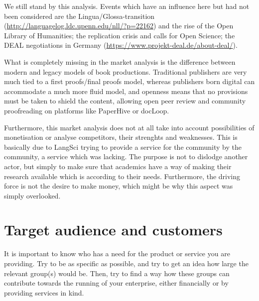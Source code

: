 \documentclass[nonflat,smallfont
]{langsci/langscibook}
\newcommand{\background}[1]{ 
  \vspace{5mm}
  \renewcommand{\tblslinecolour}{lsDarkBlue}
  \tblssy[red]{explore2}{Background}{\vspace*{-5mm}#1}
}
\newcommand{\evaluation}[1]{
  \renewcommand{\tblslinecolour}{lsLightOrange}
  \tblssy{receipt}{Evaluation}{\vspace*{-5mm}#1}
}
\newcommand{\othersolutions}[1]{
  \renewcommand{\tblslinecolour}{lsDarkGreenOne}
  \tblssy{more}{Other solutions}{\vspace*{-5mm}#1}
}
\renewcommand{\tblssy}[4][black!12]{%
  \renewcommand{\langscisymbol}{#2}\renewcommand{\tblsboxcolor}{#1}
  \begin{mdframed}[style=yellowexercise,frametitle={#3}]
    #4
  \end{mdframed}
}
\begin{document}
\evaluation{
We still stand by this analysis. Events which have an influence here but had not been considered are the Lingua/Glossa-transition (\url{http://languagelog.ldc.upenn.edu/nll/?p=22162}) and 
the rise of the Open Library of Humanities; 
the replication crisis and calls for Open Science; 
the DEAL negotiations in Germany (\url{https://www.projekt-deal.de/about-deal/}).
}
\othersolutions{
What is completely missing in the market analysis is the difference between modern and legacy models of book productions. Traditional publishers are very much tied to a first proofs/final proofs model, whereas publishers born digital can accommodate a much more fluid model, and openness means that no provisions must be taken to shield the content, allowing open peer review and community proofreading on platforms like PaperHive or docLoop.

Furthermore, this market analysis does not at all take into account possibilities of monetisation or analyse competitors, their strenghts and weaknesses. 
This is basically due to LangSci trying to provide a service for the community by the community, a service which was lacking. The purpose is not to dislodge another actor, but simply to make sure that academics have a way of making their research available which is according to their needs. Furthermore, the driving force is not the desire to make money, which might be why this aspect was simply overlooked.
}
 
\section{Target audience and customers}
\vspace*{5mm}
\background{It is important to know who has a need for the product or service you are providing. Try to be as specific as possible, and try to get an idea how large the relevant group(s) would be. Then, try to find a way how these groups can contribute towards the running of your enterprise, either financially or by providing services in kind.
}
\end{document}
